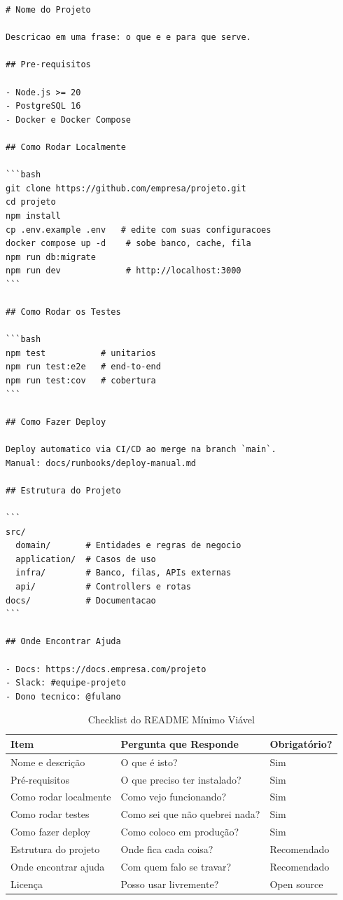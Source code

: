 \begin{lstlisting}[language={}, caption={Template de README Mínimo Viável (Markdown)}]
# Nome do Projeto

Descricao em uma frase: o que e e para que serve.

## Pre-requisitos

- Node.js >= 20
- PostgreSQL 16
- Docker e Docker Compose

## Como Rodar Localmente

```bash
git clone https://github.com/empresa/projeto.git
cd projeto
npm install
cp .env.example .env   # edite com suas configuracoes
docker compose up -d    # sobe banco, cache, fila
npm run db:migrate
npm run dev             # http://localhost:3000
```

## Como Rodar os Testes

```bash
npm test           # unitarios
npm run test:e2e   # end-to-end
npm run test:cov   # cobertura
```

## Como Fazer Deploy

Deploy automatico via CI/CD ao merge na branch `main`.
Manual: docs/runbooks/deploy-manual.md

## Estrutura do Projeto

```
src/
  domain/       # Entidades e regras de negocio
  application/  # Casos de uso
  infra/        # Banco, filas, APIs externas
  api/          # Controllers e rotas
docs/           # Documentacao
```

## Onde Encontrar Ajuda

- Docs: https://docs.empresa.com/projeto
- Slack: #equipe-projeto
- Dono tecnico: @fulano
\end{lstlisting}

\begin{table}[ht]
\centering
\caption{Checklist do README Mínimo Viável}
\begin{tabular}{@{}p{5cm}p{5cm}p{3cm}@{}}
\toprule
\textbf{Item} & \textbf{Pergunta que Responde} & \textbf{Obrigatório?} \\
\midrule
Nome e descrição & O que é isto? & Sim \\
Pré-requisitos & O que preciso ter instalado? & Sim \\
Como rodar localmente & Como vejo funcionando? & Sim \\
Como rodar testes & Como sei que não quebrei nada? & Sim \\
Como fazer deploy & Como coloco em produção? & Sim \\
Estrutura do projeto & Onde fica cada coisa? & Recomendado \\
Onde encontrar ajuda & Com quem falo se travar? & Recomendado \\
Licença & Posso usar livremente? & Open source \\
\bottomrule
\end{tabular}
\end{table}


